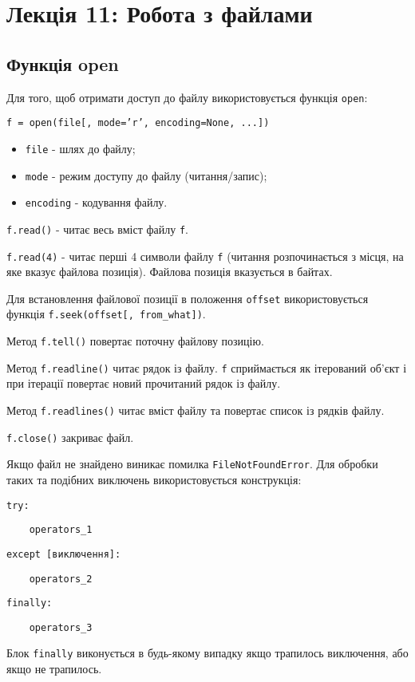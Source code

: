 \section{Лекція 11: Робота з файлами}
 
 \subsection{Функція open} 
\begin{frame}
Для того, щоб отримати доступ до файлу використовується функція \texttt{open}:

\texttt{f = open(file[, mode='r', encoding=None, ...])}

\begin{itemize}
  \item \texttt{file} - шлях до файлу;
  \item \texttt{mode} - режим доступу до файлу (читання/запис);
  \item \texttt{encoding} - кодування файлу.
\end{itemize}

\texttt{f.read()} - читає весь вміст файлу \texttt{f}. 
\end{frame}

\begin{frame}
\texttt{f.read(4)} - читає перші 4 символи файлу \texttt{f} (читання розпочинається з місця, на яке вказує файлова позиція). Файлова позиція вказується в байтах.

Для встановлення файлової позиції в положення \texttt{offset} використовується функція \texttt{f.seek(offset[, from\_what])}.

Метод \texttt{f.tell()} повертає поточну файлову позицію.

Метод \texttt{f.readline()} читає рядок із файлу.
%
\texttt{f} сприймається як ітерований об'єкт і при ітерації повертає новий прочитаний рядок із файлу.

Метод \texttt{f.readlines()} читає вміст файлу та повертає список із рядків файлу.

\texttt{f.close()} закриває файл.
\end{frame}

\begin{frame}
Якщо файл не знайдено виникає помилка \texttt{FileNotFoundError}. Для обробки таких та подібних виключень використовується конструкція:

\texttt{try:}

\texttt{~~~~operators\_1}

\texttt{except [виключення]:}

\texttt{~~~~operators\_2}

\texttt{finally:}

\texttt{~~~~operators\_3}

Блок \texttt{finally} виконується в будь-якому випадку якщо трапилось виключення, або якщо не трапилось.

\end{frame}

